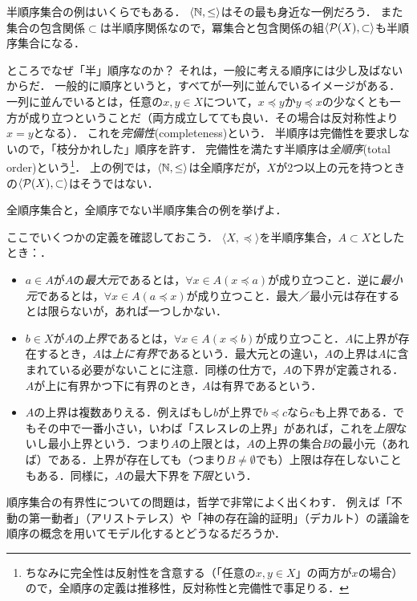 \documentclass[11pt,a4paper]{jsarticle}
\begin{document}
半順序集合の例はいくらでもある．
$\langle \mathbb{N}, \leq \rangle$はその最も身近な一例だろう．
また集合の包含関係$\subset$は半順序関係なので，冪集合と包含関係の組$\langle \mathcal{P}(X), \subset \rangle$も半順序集合になる．

ところでなぜ「半」順序なのか？
それは，一般に考える順序には少し及ばないからだ．
一般的に順序というと，すべてが一列に並んでいるイメージがある．
一列に並んでいるとは，任意の$x, y \in X$について，$x \preceq y$か$y \preceq x$の少なくとも一方が成り立つということだ（両方成立してても良い．その場合は反対称性より$x=y$となる）．
これを\emph{完備性}(completeness)という．
半順序は完備性を要求しないので，「枝分かれした」順序を許す．
完備性を満たす半順序は\emph{全順序}(total order)という\footnote{ちなみに完全性は反射性を含意する（「任意の$x,y \in X$」の両方が$x$の場合）ので，全順序の定義は推移性，反対称性と完備性で事足りる．}．
%
上の例では，$\langle \mathbb{N}, \leq \rangle$は全順序だが，$X$が2つ以上の元を持つときの$\langle \mathcal{P}(X), \subset \rangle$はそうではない．

\begin{exercise}
 全順序集合と，全順序でない半順序集合の例を挙げよ．
\end{exercise}

ここでいくつかの定義を確認しておこう．
$\langle X, \preceq \rangle$を半順序集合，$A \subset X$としたとき：．
\begin{itemize}
 \item $a \in A$が$A$の\emph{最大元}であるとは，$\forall x \in A (x \preceq a)$が成り立つこと．逆に\emph{最小元}であるとは，$\forall x \in A (a \preceq x)$が成り立つこと．最大／最小元は存在するとは限らないが，あれば一つしかない．
 \item $b \in X$が$A$の\emph{上界}であるとは，$\forall x \in A (x \preceq b)$が成り立つこと．$A$に上界が存在するとき，$A$は\emph{上に有界}であるという．最大元との違い，$A$の上界は$A$に含まれている必要がないことに注意．同様の仕方で，$A$の下界が定義される．$A$が上に有界かつ下に有界のとき，$A$は有界であるという．
 \item $A$の上界は複数ありえる．例えばもし$b$が上界で$b \preceq c$なら$c$も上界である．でもその中で一番小さい，いわば「スレスレの上界」があれば，これを\emph{上限}ないし最小上界という．つまり$A$の上限とは，$A$の上界の集合$B$の最小元（あれば）である．上界が存在しても（つまり$B \neq \emptyset$でも）上限は存在しないこともある．同様に，$A$の最大下界を\emph{下限}という．
\end{itemize}

\begin{example}
順序集合の有界性についての問題は，哲学で非常によく出くわす．
例えば「不動の第一動者」（アリストテレス）や「神の存在論的証明」（デカルト）の議論を順序の概念を用いてモデル化するとどうなるだろうか．
\end{example}
\end{document}
